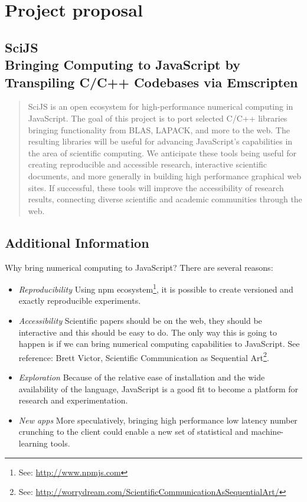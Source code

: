 \documentclass{scrartcl}
\begin{document}
\section{Project proposal}

\subsection*{\centering SciJS \\ Bringing Computing to JavaScript by Transpiling C/C++ Codebases via Emscripten}

\begin{abstract}
SciJS is an open ecosystem for high-performance numerical computing  in JavaScript. The goal of this project is to port selected C/C++ libraries bringing functionality from BLAS\cite{Blackford2002}, LAPACK\cite{Angerson1990}, and more to the web. The resulting libraries will be useful for advancing JavaScript's capabilities in the area of scientific computing. We anticipate these tools being useful for creating reproducible and accessible research, interactive scientific documents, and more generally in building high performance graphical web sites. If successful, these tools will improve the accessibility of research results, connecting diverse scientific and academic communities through the web.
\end{abstract}

\subsection*{Additional Information}

Why bring numerical computing to JavaScript? There are several reasons:

\begin{itemize}
\item \emph{Reproducibility} Using npm ecosystem\footnote{See: \url{http://www.npmjs.com}}, it is possible to create versioned and exactly reproducible experiments.
\item \emph{Accessibility} Scientific papers should be on the web, they should be interactive and this should be easy to do. The only way this is going to happen is if we can bring numerical computing capabilities to JavaScript. See reference: Brett Victor, Scientific Communication as Sequential Art\footnote{See: \url{http://worrydream.com/ScientificCommunicationAsSequentialArt/}}.
\item \emph{Exploration} Because of the relative ease of installation and the wide availability of the language, JavaScript is a good fit to become a platform for research and experimentation. 
\item \emph{New apps} More speculatively, bringing high performance low latency number crunching to the client could enable a new set of statistical and machine-learning tools.
\end{itemize}
\end{document}
